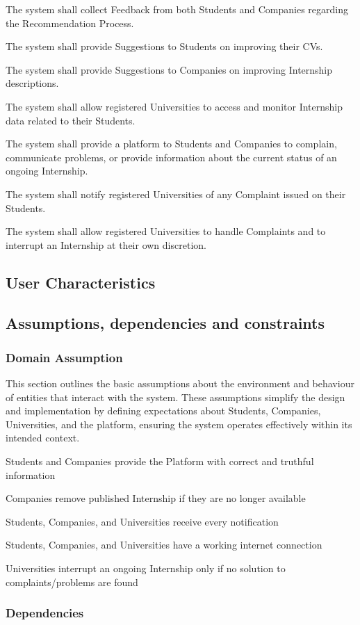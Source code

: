 \begin{enumerate}[label={\color{titleColor}[R\arabic*]}]
    \item The system shall collect Feedback from both Students and Companies regarding the Recommendation Process.
    \item The system shall provide Suggestions to Students on improving their CVs.
    \item The system shall provide Suggestions to Companies on improving Internship descriptions.
    
    \item The system shall allow registered Universities to access and monitor Internship data related to their Students.
    \item The system shall provide a platform to Students and Companies to complain, communicate problems, or provide information about the current status of an ongoing Internship.
    \item The system shall notify registered Universities of any Complaint issued on their Students.
    \item The system shall allow registered Universities to handle Complaints and to interrupt an Internship at their own discretion.
\end{enumerate}


\subsection{User Characteristics}


\subsection{Assumptions, dependencies and constraints}

\subsubsection{Domain Assumption}
This section outlines the basic assumptions about the environment and behaviour of entities that interact with the system. These assumptions simplify the design and implementation by defining expectations about Students, Companies, Universities, and the platform, ensuring the system operates effectively within its intended context.
\begin{enumerate}[label={\color{titleColor}[D\arabic*]}]
    \item Students and Companies provide the Platform with correct and truthful information
    \item Companies remove published Internship if they are no longer available
    \item Students, Companies, and Universities receive every notification
    \item Students, Companies, and Universities have a working internet connection
    \item Universities interrupt an ongoing Internship only if no solution to complaints/problems are found
\end{enumerate}

\subsubsection{Dependencies}
